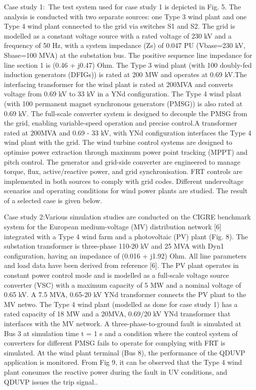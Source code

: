 Case study 1:~The test system used for case study 1 is depicted in Fig. 5. The analysis is conducted with two separate sources: one Type 3 wind plant and one Type 4 wind plant connected to the grid via switches S1 and S2. The grid is modelled as a constant voltage source with a rated voltage of 230 kV and a frequency of 50 Hz, with a system impedance (Zs) of 0.047 PU (Vbase=230 kV, Sbase=100 MVA) at the substation bus. The positive sequence line impedance for line section 1 is (0.46 + j0.47) Ohm. The Type 3 wind plant (with 100 doubly-fed induction generators (DFIGs)) is rated at 200 MW and operates at 0.69 kV.The interfacing transformer for the wind plant is rated at 200MVA and converts voltage from 0.69 kV to 33 kV in a YNd configuration. The Type 4 wind plant (with 100 permanent magnet synchronous generators (PMSG)) is also rated at 0.69 kV. The full-scale converter system is designed to decouple the PMSG from the grid, enabling variable-speed operation and precise control.A transformer rated at 200MVA and 0.69 - 33 kV, with YNd configuration interfaces the Type 4 wind plant with the grid. The wind turbine control systems are designed to optimise power extraction through maximum power point tracking (MPPT) and pitch control. The generator and grid-side converter are engineered to manage torque, flux, active/reactive power, and grid synchronisation. FRT controls are implemented in both sources to comply with grid codes. Different undervoltage scenarios and operating conditions for wind power plants are studied. The result of a selected case is given below.


Case study 2:Various simulation studies are conducted on the CIGRE benchmark system for the European medium-voltage (MV) distribution network [6] integrated with a Type 4 wind farm and a photovoltaic (PV) plant (Fig. 8). The substation transformer is three-phase 110-20 kV and 25 MVA with Dyn1 configuration, having an impedance of (0.016 + j1.92) Ohm. All line parameters and load data have been derived from reference [6]. The PV plant operates in constant power control mode and is modelled as a full-scale voltage source converter (VSC) with a maximum capacity of 5 MW and a nominal voltage of 0.65 kV. A 7.5 MVA, 0.65-20 kV YNd transformer connects the PV plant to the MV netwo. The Type 4 wind plant (modelled as done for case study 1) has a rated capacity of 18 MW and a 20MVA, 0.69/20 kV YNd transformer that interfaces with the MV network. A three-phase-to-ground fault is simulated at Bus 3 at simulation time t = 1 s and a condition where the control system of converters for different PMSG fails to operate for complying with FRT is simulated. At the wind plant terminal (Bus 8), the performance of the QDUVP application is monitored. From Fig 9, it can be observed that the Type 4 wind plant consumes the reactive power during the fault in UV conditions, and QDUVP issues the trip signal..

